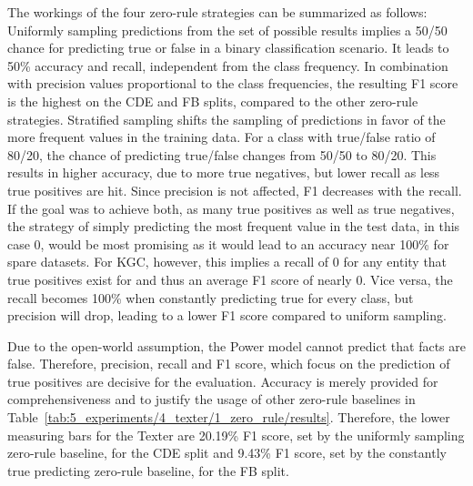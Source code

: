 The workings of the four zero-rule strategies can be summarized as follows: Uniformly sampling predictions from the set of possible results implies a 50/50 chance for predicting true or false in a binary classification scenario. It leads to 50\% accuracy and recall, independent from the class frequency. In combination with precision values proportional to the class frequencies, the resulting F1 score is the highest on the CDE and FB splits, compared to the other zero-rule strategies. Stratified sampling shifts the sampling of predictions in favor of the more frequent values in the training data. For a class with true/false ratio of 80/20, the chance of predicting true/false changes from 50/50 to 80/20. This results in higher accuracy, due to more true negatives, but lower recall as less true positives are hit. Since precision is not affected, F1 decreases with the recall. If the goal was to achieve both, as many true positives as well as true negatives, the strategy of simply predicting the most frequent value in the test data, in this case 0, would be most promising as it would lead to an accuracy near 100\% for spare datasets. For KGC, however, this implies a recall of 0 for any entity that true positives exist for and thus an average F1 score of nearly 0. Vice versa, the recall becomes 100\% when constantly predicting true for every class, but precision will drop, leading to a lower F1 score compared to uniform sampling.

Due to the open-world assumption, the Power model cannot predict that facts are false. Therefore, precision, recall and F1 score, which focus on the prediction of true positives are decisive for the evaluation. Accuracy is merely provided for comprehensiveness and to justify the usage of other zero-rule baselines in Table~\ref{tab:5_experiments/4_texter/1_zero_rule/results}. Therefore, the lower measuring bars for the Texter are 20.19\% F1 score, set by the uniformly sampling zero-rule baseline, for the CDE split and 9.43\% F1 score, set by the constantly true predicting zero-rule baseline, for the FB split.

